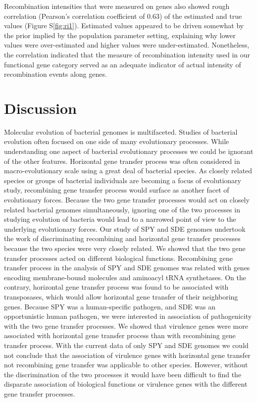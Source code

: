 \documentclass[10pt]{article}
\begin{document}
Recombination intensities that were measured on genes also showed rough
correlation (Pearson's correlation coefficient of 0.63) of the estimated and
true values (Figure S\ref{fig:ri1}).  Estimated values appeared to be driven
somewhat by the prior implied by the population parameter setting, explaining
why lower values were over-estimated and higher values were under-estimated.
Nonetheless, the correlation indicated that the measure of recombination
intensity used in our functional gene category served as an adequate indicator
of actual intensity of recombination events along genes.



\section*{Discussion}

Molecular evolution of bacterial genomes is multifaceted. Studies of bacterial
evolution often focused on one side of many evolutionary processes.  While
understanding one aspect of bacterial evolutionary processes we could be
ignorant of the other features.  Horizontal gene transfer process was often
considered in macro-evolutionary scale using a great deal of bacterial species.
As closely related species or groups of bacterial individuals are becoming a
focus of evolutionary study, recombining gene transfer process would surface as
another facet of evolutionary forces.  Because the two gene transfer processes
would act on closely related bacterial genomes simultaneously, ignoring one of the two processes
in studying evolution of bacteria would lead to a narrowed point of view to the
underlying evolutionary forces. Our study of SPY and SDE genomes undertook the
work of discriminating recombining and horizontal gene transfer
processes because the two species were very closely related.  We showed that the
two gene transfer processes acted on different biological functions. 
Recombining
gene transfer process in the analysis of SPY and SDE genomes was related with
genes encoding membrane-bound molecules and aminoacyl tRNA synthetases. On the
contrary, horizontal gene transfer process was found to be associated with
transposases, which would allow horizontal gene transfer of their neighboring
genes.  Because SPY was a human-specific pathogen, and SDE was an opportunistic
human pathogen, we were interested in association of pathogenicity with the two
gene transfer processes. We showed that virulence genes were more associated
with 
horizontal gene transfer process than with recombining gene transfer process.
With the current data of only SPY and SDE genomes we could not conclude that the
association of virulence genes with horizontal gene transfer not recombining
gene transfer was applicable to other species.  However, without the
discrimination of the two processes it would have been difficult to find the
disparate association of biological functions or virulence genes with the
different gene transfer processes. 
\end{document}
